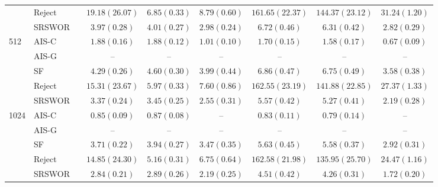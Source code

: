 \begin{tabular}{lllccc|ccc}
                     & Reject &  & $19.18(26.07)$ & $6.85(0.33)$   & $8.79(0.60)$   & $161.65(22.37)$& $144.37(23.12)$& $31.24(1.20)$  \\
                     & SRSWOR &  & $3.97(0.28)$   & $4.01(0.27)$   & $2.98(0.24)$   & $6.72(0.46)$   & $6.31(0.42)$   & $2.82(0.29)$   \\
\midrule
\multirow{5}{*}{512} & AIS-C  &  & $1.88(0.16)$   & $1.88(0.12)$   & $1.01(0.10)$   & $1.70(0.15)$   & $1.58(0.17)$   & $0.67(0.09)$   \\
                     & AIS-G  &  & --             & --             & --             & --             & --             & --             \\
                     & SF     &  & $4.29(0.26)$   & $4.60(0.30)$   & $3.99(0.44)$   & $6.86(0.47)$   & $6.75(0.49)$   & $3.58(0.38)$   \\
                     & Reject &  & $15.31(23.67)$ & $5.97(0.33)$   & $7.60(0.86)$   & $162.55(23.19)$& $141.88(22.85)$& $27.37(1.33)$  \\
                     & SRSWOR &  & $3.37(0.24)$   & $3.45(0.25)$   & $2.55(0.31)$   & $5.57(0.42)$   & $5.27(0.41)$   & $2.19(0.28)$   \\
\midrule
\multirow{5}{*}{1024}& AIS-C  &  & $0.85(0.09)$   & $0.87(0.08)$   & --             & $0.83(0.11)$   & $0.79(0.14)$   & --             \\
                     & AIS-G  &  & --             & --             & --             & --             & --             & --             \\
                     & SF     &  & $3.71(0.22)$   & $3.94(0.27)$   & $3.47(0.35)$   & $5.63(0.45)$   & $5.58(0.37)$   & $2.92(0.31)$   \\
                     & Reject &  & $14.85(24.30)$ & $5.16(0.31)$   & $6.75(0.64)$   & $162.58(21.98)$& $135.95(25.70)$& $24.47(1.16)$  \\
                     & SRSWOR &  & $2.84(0.21)$   & $2.89(0.26)$   & $2.19(0.25)$   & $4.51(0.42)$   & $4.26(0.31)$   & $1.72(0.20)$   \\
\bottomrule
\end{tabular}
